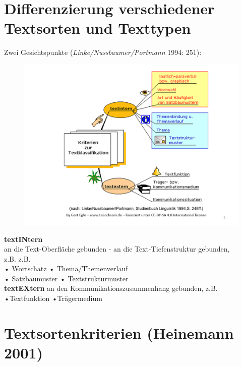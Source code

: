 \documentclass[
  letterpaper,
]{scrbook}
\begin{document}
\hypertarget{differenzierung-verschiedener-textsorten-und-texttypen}{%
\section{Differenzierung verschiedener Textsorten und
Texttypen}\label{differenzierung-verschiedener-textsorten-und-texttypen}}

Zwei Gesichtspunkte (\emph{Linke/Nussbaumer/Portmann} 1994: 251):\\

\begin{figure}

{\centering 

\href{http://teachsam.de/deutsch/d_lingu/txtlin/txtsort_1.htm}{\includegraphics[width=1\textwidth,height=\textheight]{./pictures/textfunktionen_dia_2_int_ext_klassen.PNG}}

}

\end{figure}

\textbf{textINtern}\\
an die Text-Oberfläche gebunden - an die Text-Tiefenstruktur gebunden,\\
z.B. z.B.\\
• Wortschatz • Thema/Themenverlauf\\
• Satzbaumuster • Textstrukturmuster\\

\textbf{textEXtern} an den Kommunikationszusammenhang gebunden, z.B.
•Textfunktion •Trägermedium

\hypertarget{textsortenkriterien-heinemann-2001}{%
\section{Textsortenkriterien (Heinemann
2001)}\label{textsortenkriterien-heinemann-2001}}
\end{document}
